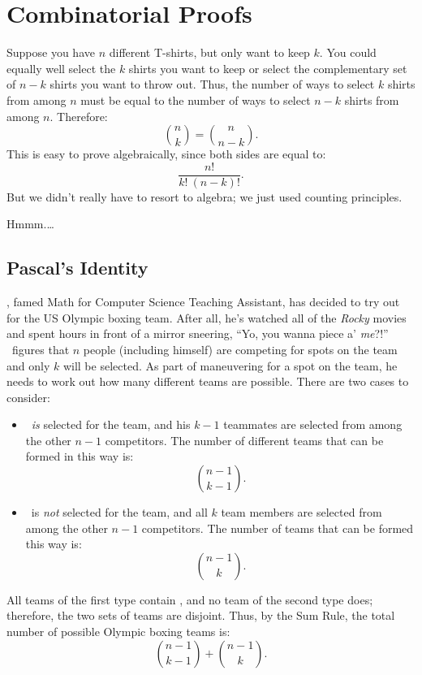 \section{Combinatorial Proofs}\label{combinatorial_proof_sec}

Suppose you have $n$ different T-shirts, but only want to keep $k$.
You could equally well select the $k$ shirts you want to keep or
select the complementary set of $n - k$ shirts you want to throw out.
Thus, the number of ways to select $k$ shirts from among $n$ must be
equal to the number of ways to select $n - k$ shirts from among $n$.
Therefore:
%
\[
    \binom{n}{k} = \binom{n}{n-k}.
\]
%
This is easy to prove algebraically, since both sides are equal to:
%
\[
    \frac{n!}{k!\ (n-k)!}.
\]
%
But we didn't really have to resort to algebra; we just used counting
principles.

Hmmm.\dots

\subsection{Pascal's Identity}

\Jay, famed Math for Computer Science Teaching Assistant, has decided
to try out for the US Olympic boxing team.  After all, he's watched
all of the \emph{Rocky} movies and spent hours in front of a mirror
sneering, ``Yo, you wanna piece a' \emph{me}?!''  \Jay\ figures that $n$
people (including himself) are competing for spots on the team and
only $k$ will be selected.  As part of maneuvering for a spot on the
team, he needs to work out how many different teams are possible.
There are two cases to consider:

\begin{itemize}

\item \Jay\ \emph{is} selected for the team, and his $k - 1$
  teammates are selected from among the other $n - 1$ competitors.
  The number of different teams that can be formed in this way is:
%
\[
    \binom{n-1}{k-1}.
\]

\item \Jay\ is \emph{not} selected for the team, and all $k$ team
members are selected from among the other $n - 1$ competitors.  The
number of teams that can be formed this way is:
%
\[
    \binom{n - 1}{k}.
\]

\end{itemize}

All teams of the first type contain \Jay, and no team of the second
type does; therefore, the two sets of teams are disjoint.  Thus, by
the Sum Rule, the total number of possible Olympic boxing teams is:
%
\[
    \binom{n-1}{k-1} + \binom{n - 1}{k}.
\]

